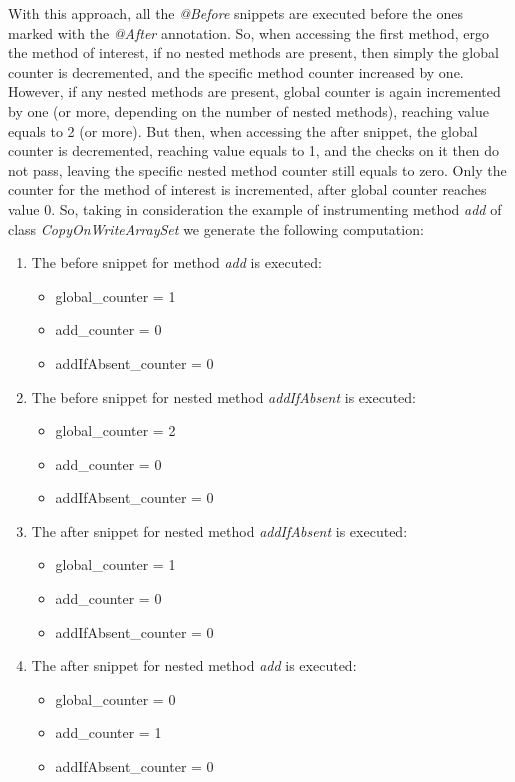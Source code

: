 \documentclass[]{usiinfthesis}
\begin{document}

\noindent
With this approach, all the \textit{@Before} snippets are executed before the ones marked with the \textit{@After} annotation. So, when accessing the first method, ergo the method of interest, if no nested methods are present, then simply the global counter is decremented, and the specific method counter increased by one. However, if any nested methods are present, global counter is again incremented by one (or more, depending on the number of nested methods), reaching value equals to 2 (or more). But then, when accessing the after snippet, the global counter is decremented, reaching value equals to 1, and the checks on it then do not pass, leaving the specific nested method counter still equals to zero. Only the counter for the method of interest is incremented, after global counter reaches value 0. So, taking in consideration the example of instrumenting method \textit{add} of class \textit{CopyOnWriteArraySet} we generate the following computation:
\begin{enumerate}
    \item The before snippet for method \textit{add} is executed:
    \begin{itemize}
        \item global\_counter = 1
        \item add\_counter = 0
        \item addIfAbsent\_counter = 0
    \end{itemize}
    \item The before snippet for nested method \textit{addIfAbsent} is executed:
    \begin{itemize}
        \item global\_counter = 2
        \item add\_counter = 0
        \item addIfAbsent\_counter = 0
    \end{itemize}
    \item The after snippet for nested method \textit{addIfAbsent} is executed:
    \begin{itemize}
        \item global\_counter = 1
        \item add\_counter = 0
        \item addIfAbsent\_counter = 0
    \end{itemize}
    \item The after snippet for nested method \textit{add} is executed:
    \begin{itemize}
        \item global\_counter = 0
        \item add\_counter = 1
        \item addIfAbsent\_counter = 0
    \end{itemize}
\end{enumerate}
\end{document}
